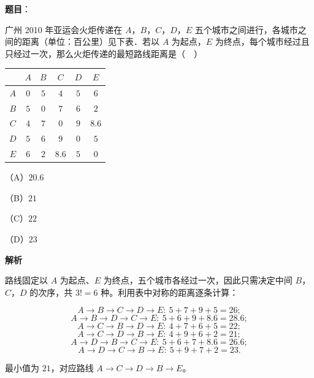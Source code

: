 \begin{answer}

\textbf{题目}：

广州 2010 年亚运会火炬传递在 $A$，$B$，$C$，$D$，$E$ 五个城市之间进行，各城市之间的距离（单位：百公里）见下表．若以 $A$ 为起点，$E$ 为终点，每个城市经过且只经过一次，那么火炬传递的最短路线距离是（　）

\begin{center}
\begin{tabular}{cccccc}
\toprule
 & $A$ & $B$ & $C$ & $D$ & $E$ \\
\midrule
$A$ & $0$ & $5$ & $4$ & $5$ & $6$ \\
$B$ & $5$ & $0$ & $7$ & $6$ & $2$ \\
$C$ & $4$ & $7$ & $0$ & $9$ & $8.6$ \\
$D$ & $5$ & $6$ & $9$ & $0$ & $5$ \\
$E$ & $6$ & $2$ & $8.6$ & $5$ & $0$ \\
\bottomrule
\end{tabular}
\end{center}

（A）$20.6$

（B）$21$

（C）$22$

（D）$23$

\textbf{解析}

路线固定以 $A$ 为起点、$E$ 为终点，五个城市各经过一次，因此只需决定中间 $B$，$C$，$D$ 的次序，共 $3!=6$ 种。利用表中对称的距离逐条计算：

\nopagebreak[4]
\[A\to B\to C\to D\to E:\ 5+7+9+5=26;\]
\nopagebreak[4]
\[A\to B\to D\to C\to E:\ 5+6+9+8.6=28.6;\]
\nopagebreak[4]
\[A\to C\to B\to D\to E:\ 4+7+6+5=22;\]
\nopagebreak[4]
\[A\to C\to D\to B\to E:\ 4+9+6+2=21;\]
\nopagebreak[4]
\[A\to D\to B\to C\to E:\ 5+6+7+8.6=26.6;\]
\nopagebreak[4]
\[A\to D\to C\to B\to E:\ 5+9+7+2=23.\]

最小值为 $21$，对应路线 $A\to C\to D\to B\to E$。


\end{answer}
